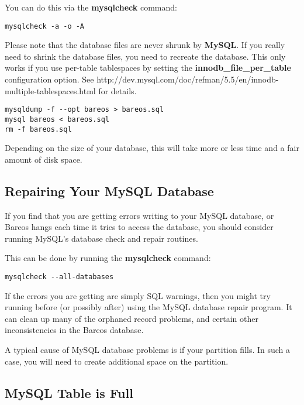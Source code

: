 You can do this via the {\bf mysqlcheck} command:
\footnotesize
\begin{verbatim}
mysqlcheck -a -o -A
\end{verbatim}
\normalsize

Please note that the database files are never shrunk by {\bf MySQL}. If you really need to shrink the database files, you need to recreate the database. This only works if you use per-table tablespaces by setting the {\bf innodb\_file\_per\_table} configuration option.
See
{http://dev.mysql.com/doc/refman/5.5/en/innodb-multiple-tablespaces.html} for details.

\footnotesize
\begin{verbatim}
mysqldump -f --opt bareos > bareos.sql
mysql bareos < bareos.sql
rm -f bareos.sql
\end{verbatim}
\normalsize

Depending on the size of your database, this will take more or less time and a
fair amount of disk space.

\label{DatabaseRepair}
\label{RepairingMySQL}
\subsection{Repairing Your MySQL Database}

If you find that you are getting errors writing to your MySQL database, or
Bareos hangs each time it tries to access the database, you should consider
running MySQL's database check and repair routines.

This can be done by running the {\bf mysqlcheck } command:
\footnotesize
\begin{verbatim}
mysqlcheck --all-databases
\end{verbatim}
\normalsize

If the errors you are getting are simply SQL warnings, then you might try
running  before (or possibly after) using the MySQL database repair
program. It can clean up many of the orphaned record problems, and certain
other inconsistencies in the Bareos database.

A typical cause of MySQL database problems is if your partition fills. In
such a case, you will need to create additional space on the partition.


\subsection{MySQL Table is Full}

